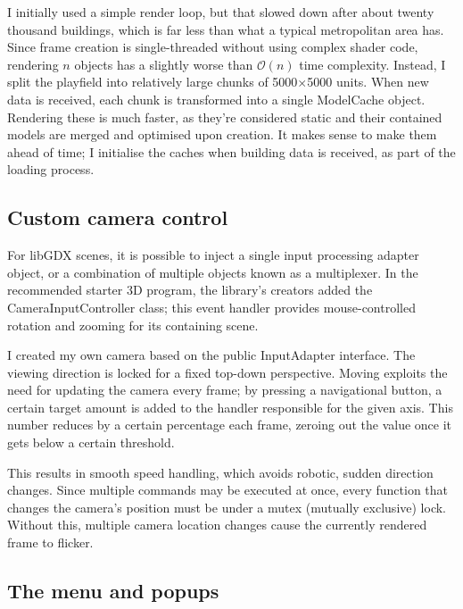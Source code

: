 I initially used a simple render loop, but that slowed down after about twenty thousand buildings, which is far less than what a typical metropolitan area has. Since frame creation is single-threaded without using complex shader code, rendering $n$ objects has a slightly worse than $\mathcal{O}(n)$ time complexity. Instead, I split the playfield into relatively large chunks of 5000$\times$5000 units. When new data is received, each chunk is transformed into a single ModelCache object. Rendering these is much faster, as they're considered static and their contained models are merged and optimised upon creation.\cite{LibgdxModelCache} It makes sense to make them ahead of time; I initialise the caches when building data is received, as part of the loading process.

\subsection{Custom camera control}

For libGDX scenes, it is possible to inject a single input processing adapter object, or a combination of multiple objects known as a multiplexer. In the recommended starter 3D program\cite{basic3DlibGDX}, the library's creators added the CameraInputController class; this event handler provides mouse-controlled rotation and zooming for its containing scene.

I created my own camera based on the public InputAdapter interface. The viewing direction is locked for a fixed top-down perspective. Moving exploits the need for updating the camera every frame; by pressing a navigational button, a certain target amount is added to the handler responsible for the given axis. This number reduces by a certain percentage each frame, zeroing out the value once it gets below a certain threshold. %

This results in smooth speed handling, which avoids robotic, sudden direction changes. Since multiple commands may be executed at once, every function that changes the camera's position must be under a mutex (mutually exclusive) lock. Without this, multiple camera location changes cause the currently rendered frame to flicker.

\subsection{The menu and popups}

